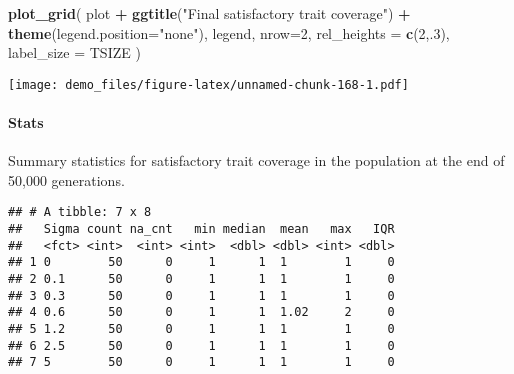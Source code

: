 \documentclass[]{book}
\newenvironment{Shaded}{\begin{snugshade}}{\end{snugshade}}
\newcommand{\DataTypeTok}[1]{\textcolor[rgb]{0.13,0.29,0.53}{#1}}
\newcommand{\DecValTok}[1]{\textcolor[rgb]{0.00,0.00,0.81}{#1}}
\newcommand{\KeywordTok}[1]{\textcolor[rgb]{0.13,0.29,0.53}{\textbf{#1}}}
\newcommand{\NormalTok}[1]{#1}
\newcommand{\OperatorTok}[1]{\textcolor[rgb]{0.81,0.36,0.00}{\textbf{#1}}}
\newcommand{\OtherTok}[1]{\textcolor[rgb]{0.56,0.35,0.01}{#1}}
\newcommand{\StringTok}[1]{\textcolor[rgb]{0.31,0.60,0.02}{#1}}
\let\oldparagraph\paragraph
\renewcommand{\paragraph}[1]{\oldparagraph{#1}\mbox{}}
\begin{document}
\begin{Shaded}
\begin{Highlighting}[]
\KeywordTok{plot_grid}\NormalTok{(}
\NormalTok{  plot }\OperatorTok{+}
\StringTok{    }\KeywordTok{ggtitle}\NormalTok{(}\StringTok{"Final satisfactory trait coverage"}\NormalTok{) }\OperatorTok{+}
\StringTok{    }\KeywordTok{theme}\NormalTok{(}\DataTypeTok{legend.position=}\StringTok{"none"}\NormalTok{),}
\NormalTok{  legend,}
  \DataTypeTok{nrow=}\DecValTok{2}\NormalTok{,}
  \DataTypeTok{rel_heights =} \KeywordTok{c}\NormalTok{(}\DecValTok{2}\NormalTok{,.}\DecValTok{3}\NormalTok{),}
  \DataTypeTok{label_size =}\NormalTok{ TSIZE}
\NormalTok{)}
\end{Highlighting}
\end{Shaded}

\texttt{[image: demo\_files/figure-latex/unnamed-chunk-168-1.pdf]}

\hypertarget{stats-32}{%
\paragraph{Stats}\label{stats-32}}

Summary statistics for satisfactory trait coverage in the population at the end of 50,000 generations.

\begin{Shaded}
\end{Shaded}

\begin{verbatim}
## # A tibble: 7 x 8
##   Sigma count na_cnt   min median  mean   max   IQR
##   <fct> <int>  <int> <int>  <dbl> <dbl> <int> <dbl>
## 1 0        50      0     1      1  1        1     0
## 2 0.1      50      0     1      1  1        1     0
## 3 0.3      50      0     1      1  1        1     0
## 4 0.6      50      0     1      1  1.02     2     0
## 5 1.2      50      0     1      1  1        1     0
## 6 2.5      50      0     1      1  1        1     0
## 7 5        50      0     1      1  1        1     0
\end{verbatim}
\end{document}
